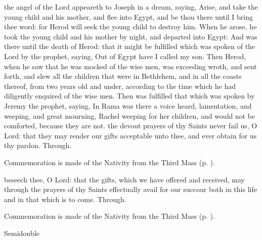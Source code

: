  the angel of the Lord appeareth to Joseph in a dream, saying, Arise, and take the young child and his mother, and flee into Egypt, and be thou there until I bring thee word: for Herod will seek the young child to destroy him. When he arose, he took the young child and his mother by night, and departed into Egypt: And was there until the death of Herod: that it might be fulfilled which was spoken of the Lord by the prophet, saying, Out of Egypt have I called my son. Then Herod, when he saw that he was mocked of the wise men, was exceeding wroth, and sent forth, and slew all the children that were in Bethlehem, and in all the coasts thereof, from two years old and under, according to the time which he had diligently enquired of the wise men. Then was fulfilled that which was spoken by Jeremy the prophet, saying, In Rama was there a voice heard, lamentation, and weeping, and great mourning, Rachel weeping for her children, and would not be comforted, because they are not.
\secret
{} the devout prayers of thy Saints never fail us, O Lord: that they may render our gifts acceptable unto thee, and ever obtain for us thy pardon. Through.
\begin{rubric}
    Commemoration is made of the Nativity from the Third Mass (p. \pageref{NativityMassIIISecret}).
\end{rubric}
\postcommunion
{} beseech thee, O Lord: that the gifts, which we have offered and received, may through the prayers of thy Saints effectually avail for our succour both in this life and in that which is to come. Through.
\begin{rubric}
    Commemoration is made of the Nativity from the Third Mass (p. \pageref{NativityMassIIIPostcommunion}).
\end{rubric}


\begin{inhead}
{Semidouble}
\end{inhead}

\properantiphonfix

